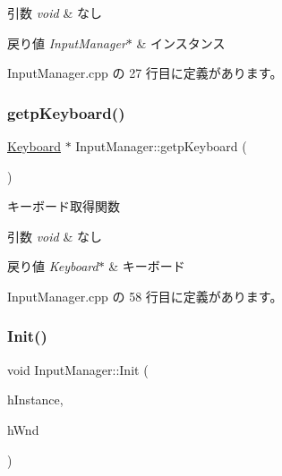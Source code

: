 \begin{DoxyParams}{引数}
{\em void} & なし \\
\hline
\end{DoxyParams}

\begin{DoxyRetVals}{戻り値}
{\em Input\+Manager$\ast$} & インスタンス \\
\hline
\end{DoxyRetVals}


 Input\+Manager.\+cpp の 27 行目に定義があります。

\mbox{\label{class_input_manager_a2914fd5b823ad5b41e8ee5b0f605b6d6}} 
\subsubsection{\texorpdfstring{getp\+Keyboard()}{getpKeyboard()}}
{\footnotesize\ttfamily \mbox{\hyperlink{class_keyboard}{Keyboard}} $\ast$ Input\+Manager\+::getp\+Keyboard (\begin{DoxyParamCaption}{ }\end{DoxyParamCaption})}



キーボード取得関数 


\begin{DoxyParams}{引数}
{\em void} & なし \\
\hline
\end{DoxyParams}

\begin{DoxyRetVals}{戻り値}
{\em Keyboard$\ast$} & キーボード \\
\hline
\end{DoxyRetVals}


 Input\+Manager.\+cpp の 58 行目に定義があります。

\mbox{\label{class_input_manager_ab888da1f3f6cec99d27362276757b12b}} 
\subsubsection{\texorpdfstring{Init()}{Init()}}
{\footnotesize\ttfamily void Input\+Manager\+::\+Init (\begin{DoxyParamCaption}\item[{H\+I\+N\+S\+T\+A\+N\+CE}]{h\+Instance,  }\item[{H\+W\+ND}]{h\+Wnd }\end{DoxyParamCaption})}




